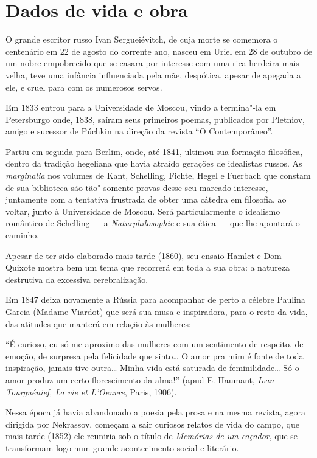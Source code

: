 \section{Dados de vida e obra}

O grande escritor russo Ivan Sergueiévitch, de cuja morte se comemora o
centenário em 22 de agosto do corrente ano, nasceu em Uriel em 28 de
outubro de um nobre empobrecido que se casara por interesse com uma rica
herdeira mais velha, teve uma infância influenciada pela mãe, despótica,
apesar de apegada a ele, e cruel para com os numerosos servos.

Em 1833 entrou para a Universidade de Moscou, vindo a termina"-la em
Petersburgo onde, 1838, saíram seus primeiros poemas, publicados por
Pletniov, amigo e sucessor de Púchkin na direção da revista ``O
Contemporâneo''.

Partiu em seguida para Berlim, onde, até 1841, ultimou sua formação
filosófica, dentro da tradição hegeliana que havia atraído gerações de
idealistas russos. As \emph{marginalia} nos volumes de Kant, Schelling,
Fichte, Hegel e Fuerbach que constam de sua biblioteca são tão"-somente
provas desse seu marcado interesse, juntamente com a tentativa frustrada
de obter uma cátedra em filosofia, ao voltar, junto à Universidade de
Moscou. Será particularmente o idealismo romântico de Schelling --- a
\emph{Naturphilosophie} e sua ética --- que lhe apontará o caminho.

Apesar de ter sido elaborado mais tarde (1860), seu ensaio Hamlet e Dom
Quixote mostra bem um tema que recorrerá em toda a sua obra: a natureza
destrutiva da excessiva cerebralização.

Em 1847 deixa novamente a Rússia para acompanhar de perto a célebre
Paulina Garcia (Madame Viardot) que será sua musa e inspiradora, para o
resto da vida, das atitudes que manterá em relação às mulheres:

``É curioso, eu só me aproximo das mulheres com um sentimento de
respeito, de emoção, de surpresa pela felicidade que sinto\ldots{} O amor pra
mim é fonte de toda inspiração, jamais tive outra\ldots{} Minha vida está
saturada de feminilidade\ldots{} Só o amor produz um certo florescimento da
alma!'' (apud E. Haumant, \emph{Ivan Tourguénief, La vie et L'Oeuvre},
Paris, 1906).

Nessa época já havia abandonado a poesia pela prosa e na mesma revista,
agora dirigida por Nekrassov, começam a sair curiosos relatos de vida do
campo, que mais tarde (1852) ele reuniria sob o título de \emph{Memórias
de um caçador}, que se transformam logo num grande acontecimento social
e literário.


